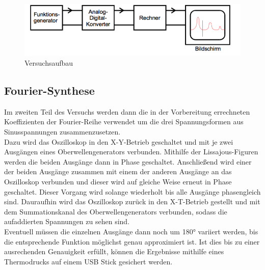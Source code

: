 \begin{figure}[h]
  \centering
  \includegraphics[width=15cm]{Aufbau.png}
  \caption{Versuchsaufbau \cite{skript}}
  \label{fig:Aufbau}
\end{figure}

\subsection{Fourier-Synthese}
Im zweiten Teil des Versuchs werden dann die in der Vorbereitung errechneten
Koeffizienten der Fourier-Reihe verwendet um die drei Spannungsformen aus
Sinusspannungen zusammenzusetzen. \\
Dazu wird das Oszilloskop in den X-Y-Betrieb geschaltet und mit je zwei
Ausgängen eines Oberwellengenerators verbunden. Mithilfe der Lissajous-Figuren
werden die beiden Ausgänge dann in Phase geschaltet. Anschließend wird einer der
beiden Ausgänge zusammen mit einem der anderen Ausgänge an das Oszilloskop
verbunden und dieser wird auf gleiche Weise erneut in Phase
geschaltet. Dieser Vorgang wird solange wiederholt bis alle Ausgänge phasengleich
sind. Dauraufhin wird das Oszilloskop zurück in den X-T-Betrieb gestellt und mit
dem Summationskanal des Oberwellengenerators verbunden, sodass die aufaddierten
Spannungen zu sehen sind. \\
Eventuell müssen die einzelnen Ausgänge dann noch um 180° variiert werden, bis
die entsprechende Funktion möglichst genau approximiert ist. Ist dies bis zu
einer ausrechenden Genauigkeit erfüllt, können die Ergebnisse mithilfe eines
Thermodrucks auf einem USB Stick gesichert werden.
